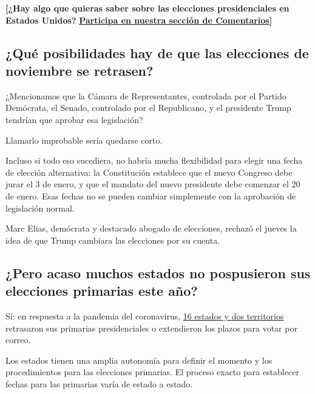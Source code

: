 \textbf{{[}¿Hay algo que quieras saber sobre las elecciones
presidenciales en Estados Unidos?}
\textbf{\href{https://www.nytimes.com/es/2020/07/30/espanol/estados-unidos/trump-retrasar-elecciones.html\#commentsContainer}{Participa
en nuestra sección de Comentarios}{]}}

\hypertarget{quuxe9-posibilidades-hay-de-que-las-elecciones-de-noviembre-se-retrasen}{%
\subsection{¿Qué posibilidades hay de que las elecciones de noviembre se
retrasen?}\label{quuxe9-posibilidades-hay-de-que-las-elecciones-de-noviembre-se-retrasen}}

¿Mencionamos que la Cámara de Representantes, controlada por el Partido
Demócrata, el Senado, controlado por el Republicano, y el presidente
Trump tendrían que aprobar esa legislación?

Llamarlo improbable sería quedarse corto.

Incluso si todo eso sucediera, no habría mucha flexibilidad para elegir
una fecha de elección alternativa: la Constitución establece que el
nuevo Congreso debe jurar el 3 de enero, y que el mandato del nuevo
presidente debe comenzar el 20 de enero. Esas fechas no se pueden
cambiar simplemente con la aprobación de legislación normal.

Marc Elias, demócrata y destacado abogado de elecciones, rechazó el
jueves la idea de que Trump cambiara las elecciones por su cuenta.

\hypertarget{pero-acaso-muchos-estados-no-pospusieron-sus-elecciones-primarias-este-auxf1o}{%
\subsection{¿Pero acaso muchos estados no pospusieron sus elecciones
primarias este
año?}\label{pero-acaso-muchos-estados-no-pospusieron-sus-elecciones-primarias-este-auxf1o}}

Sí: en respuesta a la pandemia del coronavirus,
\href{https://www.nytimes.com/article/2020-campaign-primary-calendar-coronavirus.html}{16
estados y dos territorios} retrasaron sus primarias presidenciales o
extendieron los plazos para votar por correo.

Los estados tienen una amplia autonomía para definir el momento y los
procedimientos para las elecciones primarias. El proceso exacto para
establecer fechas para las primarias varía de estado a estado.

